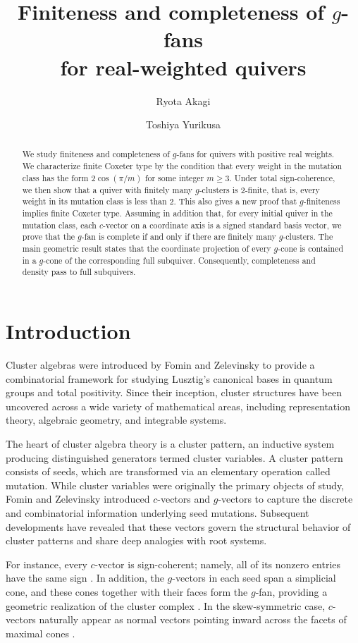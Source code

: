 \documentclass[11pt,reqno]{amsart}
\title[Finiteness and completeness of $g$-fans]
{Finiteness and completeness of $g$-fans\\ for real-weighted quivers}
\author{Ryota Akagi}
\author{Toshiya Yurikusa}
\numberwithin{equation}{section}
\theoremstyle{definition}
\theoremstyle{plain}
\begin{document}
\begin{abstract}
	We study finiteness and completeness of $g$-fans for quivers with positive real weights. We characterize finite Coxeter type by the condition that every weight in the mutation class has the form $2\cos(\pi/m)$ for some integer $m\geq3$. Under total sign-coherence, we then show that a quiver with finitely many $g$-clusters is $2$-finite, that is, every weight in its mutation class is less than $2$. This also gives a new proof that $g$-finiteness implies finite Coxeter type. Assuming in addition that, for every initial quiver in the mutation class, each $c$-vector on a coordinate axis is a signed standard basis vector, we prove that the $g$-fan is complete if and only if there are finitely many $g$-clusters. The main geometric result states that the coordinate projection of every $g$-cone is contained in a $g$-cone of the corresponding full subquiver. Consequently, completeness and density pass to full subquivers.
\end{abstract}

\maketitle

\section{Introduction}\label{sec:intro}
	Cluster algebras were introduced by Fomin and Zelevinsky \cite{FZ02} to provide a combinatorial framework for studying Lusztig's canonical bases in quantum groups and total positivity. Since their inception, cluster structures have been uncovered across a wide variety of mathematical areas, including representation theory, algebraic geometry, and integrable systems.
	
	The heart of cluster algebra theory is a cluster pattern, an inductive system producing distinguished generators termed cluster variables. A cluster pattern consists of seeds, which are transformed via an elementary operation called mutation. While cluster variables were originally the primary objects of study, Fomin and Zelevinsky \cite{FZ07} introduced $c$-vectors and $g$-vectors to capture the discrete and combinatorial information underlying seed mutations. Subsequent developments have revealed that these vectors govern the structural behavior of cluster patterns and share deep analogies with root systems.
	
	For instance, every $c$-vector is sign-coherent; namely, all of its nonzero entries have the same sign \cite{GHKK18}. In addition, the $g$-vectors in each seed span a simplicial cone, and these cones together with their faces form the $g$-fan, providing a geometric realization of the cluster complex \cite{GHKK18,Re14}. In the skew-symmetric case, $c$-vectors naturally appear as normal vectors pointing inward across the facets of maximal cones \cite{NZ12}.
\end{document}
